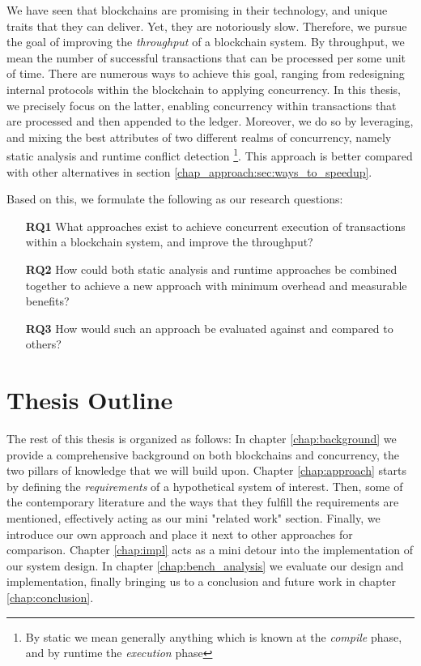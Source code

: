 We have seen that blockchains are promising in their technology, and unique traits that they can
deliver. Yet, they are notoriously slow. Therefore, we pursue the goal of improving the
\textit{throughput} of a blockchain system. By throughput, we mean the number of successful
transactions that can be processed per some unit of time. There are numerous ways to
achieve this goal, ranging from redesigning internal protocols within the blockchain to applying
concurrency. In this thesis, we precisely focus on the latter, enabling concurrency within
transactions that are processed and then appended to the ledger. Moreover, we do so by leveraging,
and mixing the best attributes of two different realms of concurrency, namely static analysis and
runtime conflict detection \footnote{By static we mean generally anything which is known at the
\textit{compile} phase, and by runtime the \textit{execution} phase}. This approach is better
compared with other alternatives in section \ref{chap_approach:sec:ways_to_speedup}.

Based on this, we formulate the following as our research questions:

 \begin{enumerate}
    \item [\textbf{RQ1}] What approaches exist to achieve concurrent execution of transactions
    within a blockchain system, and improve the throughput?

    \item [\textbf{RQ2}] How could both static analysis and runtime approaches be combined together
    to achieve a new approach with minimum overhead and measurable benefits?

    \item [\textbf{RQ3}] How would such an approach be evaluated against and compared to others?
 \end{enumerate}

\section{Thesis Outline}
The rest of this thesis is organized as follows: In chapter \ref{chap:background} we provide a
comprehensive background on both blockchains and concurrency, the two pillars of knowledge that we
will build upon. Chapter \ref{chap:approach} starts by defining the \textit{requirements} of a
hypothetical system of interest. Then, some of the contemporary literature and the ways that they
fulfill the requirements are mentioned, effectively acting as our mini "related work" section.
Finally, we introduce our own approach and place it next to other approaches for comparison. Chapter
\ref{chap:impl} acts as a mini detour into the implementation of our system design. In chapter
\ref{chap:bench_analysis} we evaluate our design and implementation, finally bringing us to a
conclusion and future work in chapter \ref{chap:conclusion}.


